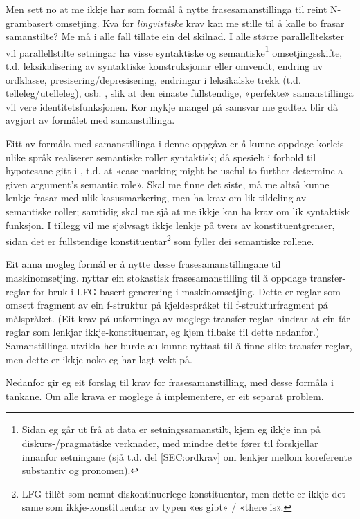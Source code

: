 \documentclass[11pt,a4paper,oneside,draft]{report}
\begin{document}
Men sett no at me ikkje har som formål å nytte frasesamanstillinga til
reint N-grambasert omsetjing. Kva for \emph{lingvistiske} krav kan me
stille til å kalle to frasar samanstilte? Me må i alle fall tillate
ein del skilnad.  I alle større parallelltekster vil parallellstilte
setningar ha visse syntaktiske og semantiske\footnote{Sidan eg går ut frå at data er setningssamanstilt, kjem eg
       ikkje inn på diskurs-/pragmatiske verknader, med mindre dette
       fører til forskjellar innanfor setningane (sjå t.d. del
       \ref{SEC:ordkrav} om lenkjer mellom koreferente substantiv og
       pronomen). } omsetjingsskifte,
t.d. leksikalisering av syntaktiske konstruksjonar eller omvendt,
endring av ordklasse, presisering/depresisering, endringar i leksikalske
trekk (t.d. telleleg/utelleleg),
osb. \citep[s.~56--62]{munday2001its}, slik at den einaste
fullstendige, «perfekte» samanstillinga vil vere
identitetsfunksjonen. Kor mykje mangel på samsvar me godtek blir då
avgjort av formålet med samanstillinga.

Eitt av formåla med samanstillinga i denne oppgåva er å kunne oppdage
korleis ulike språk realiserer semantiske roller syntaktisk; då
spesielt i forhold til hypotesane gitt i \citet[s.~7]{xpar2008rcn},
t.d. at «case marking might be useful to further determine a given
argument's semantic role». Skal me finne det siste, må me altså kunne
lenkje frasar med ulik kasusmarkering, men ha krav om lik tildeling av
semantiske roller; samtidig skal me sjå at me ikkje kan ha krav om lik
syntaktisk funksjon. I tillegg vil me sjølvsagt ikkje lenkje på tvers
av konstituentgrenser, sidan det er fullstendige konstituentar\footnote{LFG tillèt som nemnt diskontinuerlege konstituentar, men dette
        er ikkje det same som ikkje-konstituentar av typen «es gibt» /
        «there is». }
som fyller dei semantiske rollene.

Eit anna mogleg formål er å nytte desse frasesamanstillingane til
maskinomsetjing. \citet{riezler2006gmt} nyttar ein stokastisk
frasesamanstilling til å oppdage transfer-reglar for bruk i LFG-basert
generering i maskinomsetjing. Dette er reglar som omsett fragment av
ein f-struktur på kjeldespråket til f-strukturfragment på
målspråket. (Eit krav på utforminga av moglege transfer-reglar hindrar
at ein får reglar som lenkjar ikkje-konstituentar, eg kjem tilbake til
dette nedanfor.)  Samanstillinga utvikla her burde au kunne nyttast
til å finne slike transfer-reglar, men dette er ikkje noko eg har lagt
vekt på.

Nedanfor gir eg eit forslag til krav for frasesamanstilling, med desse
formåla i tankane. Om alle krava er moglege å implementere, er eit
separat problem.
\end{document}
